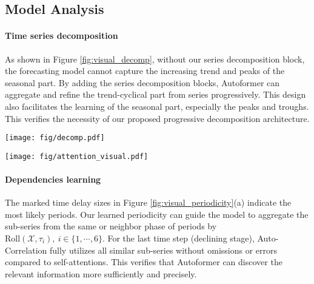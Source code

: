 \subsection{Model Analysis}
\paragraph{Time series decomposition} As shown in Figure \ref{fig:visual_decomp}, without our series decomposition block, the forecasting model cannot capture the increasing trend and peaks of the seasonal part. By adding the series decomposition blocks, Autoformer can aggregate and refine the trend-cyclical part from series progressively. This design also facilitates the learning of the seasonal part, especially the peaks and troughs. This verifies the necessity of our proposed progressive decomposition architecture.

\begin{figure*}[hbp]
\begin{center}
	\centerline{\texttt{[image: fig/decomp.pdf]}}
	\caption{Visualization of learned seasonal $\mathcal{X}_{\mathrm{de}}^{M}$ and trend-cyclical $\mathcal{T}_{\mathrm{de}}^{M}$ of the last decoder layer. We gradually add the decomposition blocks in decoder from left to right. This case is from ETT dataset under input-96-predict-720 setting. For clearness, we add the linear growth to raw data additionally.}
	\label{fig:visual_decomp}
	\vspace{-20pt}
\end{center}
\end{figure*}

\begin{figure*}[tbp]
  \begin{center}
    \centerline{\texttt{[image: fig/attention\_visual.pdf]}}
    \vspace{-5pt}
    \caption{Visualization of learned dependencies. For clearness, we select the top-6 time delay sizes $\tau_{1},\cdots,\tau_{6}$ of Auto-Correlation and mark them in raw series (\textcolor{red}{red} lines). For self-attentions, top-6 similar points with respect to the last time step (\textcolor{red}{red} stars) are also marked by \textcolor{orange}{orange} points.}
    \label{fig:visual_periodicity}
    \vspace{-15pt}
  \end{center}
  \end{figure*}

\paragraph{Dependencies learning} The marked time delay sizes in Figure \ref{fig:visual_periodicity}(a) indicate the most likely periods. Our learned periodicity can guide the model to aggregate the sub-series from the same or neighbor phase of periods by $\mathrm{Roll}(\mathcal{X},\tau_{i}),\ i\in\{1,\cdots,6\}$. For the last time step (declining stage), Auto-Correlation fully utilizes all similar sub-series without omissions or errors compared to self-attentions. This verifies that Autoformer can discover the relevant information more sufficiently and precisely.

